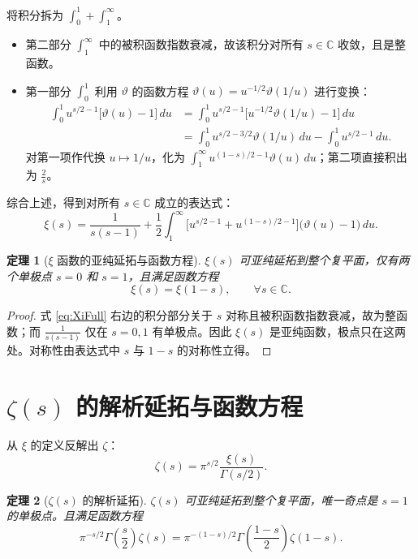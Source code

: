 \documentclass[UTF8]{ctexart}
\newtheorem{theorem}{定理}[section]
\numberwithin{equation}{section}
\newcommand{\CC}{\mathbb{C}}
\begin{document}
将积分拆为 $\int_{0}^{1} + \int_{1}^{\infty}$。
\begin{itemize}
\item 第二部分 $\int_{1}^{\infty}$ 中的被积函数指数衰减，故该积分对所有 $s\in\CC$ 收敛，且是整函数。
\item 第一部分 $\int_{0}^{1}$ 利用 $\vartheta$ 的函数方程 $\vartheta(u) = u^{-1/2} \vartheta(1/u)$ 进行变换：
\begin{align*}
\int_{0}^{1} u^{s/2 - 1} \bigl[\vartheta(u)-1\bigr] \, du
&= \int_{0}^{1} u^{s/2 - 1} \bigl[u^{-1/2} \vartheta(1/u) - 1\bigr] \, du \\
&= \int_{0}^{1} u^{s/2 - 3/2} \vartheta(1/u) \, du - \int_{0}^{1} u^{s/2 - 1} \, du.
\end{align*}
对第一项作代换 $u \mapsto 1/u$，化为 $\int_{1}^{\infty} u^{(1-s)/2 - 1} \vartheta(u) \, du$；第二项直接积出为 $\frac{2}{s}$。
\end{itemize}

综合上述，得到对所有 $s\in\CC$ 成立的表达式：
\begin{equation}\label{eq:XiFull}
\xi(s) = \frac{1}{s(s-1)} + \frac{1}{2} \int_{1}^{\infty}
\bigl[ u^{s/2 - 1} + u^{(1-s)/2 - 1} \bigr] \bigl(\vartheta(u)-1\bigr) \, du.
\end{equation}

\begin{theorem}[$\xi$ 函数的亚纯延拓与函数方程]\label{thm:XiCont}
$\xi(s)$ 可亚纯延拓到整个复平面，仅有两个单极点 $s=0$ 和 $s=1$，且满足函数方程
\[
\xi(s) = \xi(1-s), \qquad \forall s\in\CC.
\]
\end{theorem}

\begin{proof}
式 \eqref{eq:XiFull} 右边的积分部分关于 $s$ 对称且被积函数指数衰减，故为整函数；而 $\frac{1}{s(s-1)}$ 仅在 $s=0,1$ 有单极点。因此 $\xi(s)$ 是亚纯函数，极点只在这两处。对称性由表达式中 $s$ 与 $1-s$ 的对称性立得。
\end{proof}

\section{$\zeta(s)$ 的解析延拓与函数方程}

从 $\xi$ 的定义反解出 $\zeta$：
\[
\zeta(s) = \pi^{s/2} \frac{\xi(s)}{\Gamma(s/2)}.
\]

\begin{theorem}[$\zeta(s)$ 的解析延拓]\label{thm:ZetaCont}
$\zeta(s)$ 可亚纯延拓到整个复平面，唯一奇点是 $s=1$ 的单极点。且满足函数方程
\begin{equation}\label{eq:ZetaFuncEq}
\pi^{-s/2} \Gamma\!\left(\frac{s}{2}\right) \zeta(s)
= \pi^{-(1-s)/2} \Gamma\!\left(\frac{1-s}{2}\right) \zeta(1-s).
\end{equation}
\end{theorem}
\end{document}
